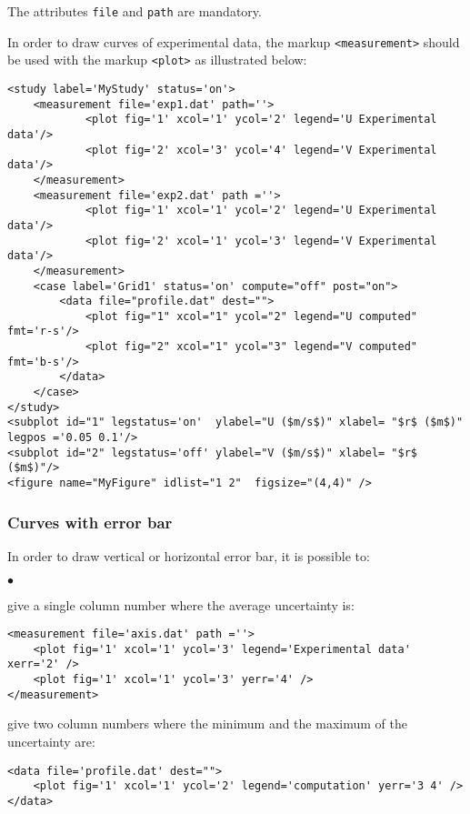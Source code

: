 \documentclass[a4paper,10pt,twoside]{article}
\begin{document}
The attributes \texttt{file} and \texttt{path} are mandatory.

In order to draw curves of experimental data, the markup \texttt{<measurement>}
should be used with the markup \texttt{<plot>} as illustrated below:

\small
\begin{verbatim}
<study label='MyStudy' status='on'>
    <measurement file='exp1.dat' path=''>
            <plot fig='1' xcol='1' ycol='2' legend='U Experimental data'/>
            <plot fig='2' xcol='3' ycol='4' legend='V Experimental data'/>
    </measurement>
    <measurement file='exp2.dat' path =''>
            <plot fig='1' xcol='1' ycol='2' legend='U Experimental data'/>
            <plot fig='2' xcol='1' ycol='3' legend='V Experimental data'/>
    </measurement>
    <case label='Grid1' status='on' compute="off" post="on">
        <data file="profile.dat" dest="">
            <plot fig="1" xcol="1" ycol="2" legend="U computed" fmt='r-s'/>
            <plot fig="2" xcol="1" ycol="3" legend="V computed" fmt='b-s'/>
        </data>
    </case>
</study>
<subplot id="1" legstatus='on'  ylabel="U ($m/s$)" xlabel= "$r$ ($m$)" legpos ='0.05 0.1'/>
<subplot id="2" legstatus='off' ylabel="V ($m/s$)" xlabel= "$r$ ($m$)"/>
<figure name="MyFigure" idlist="1 2"  figsize="(4,4)" />
\end{verbatim}
\normalsize

\subsubsection{Curves with error bar}\label{sec:err}

In order to draw vertical or horizontal error bar, it is possible to:
\begin{list}{$\bullet$}{}
\item give a single column number where the average uncertainty is:
\small
\begin{verbatim}
<measurement file='axis.dat' path =''>
    <plot fig='1' xcol='1' ycol='3' legend='Experimental data' xerr='2' />
    <plot fig='1' xcol='1' ycol='3' yerr='4' />
</measurement>
\end{verbatim}
\normalsize
\item give two column numbers where the minimum and the maximum of the
uncertainty are:
\small
\begin{verbatim}
<data file='profile.dat' dest="">
    <plot fig='1' xcol='1' ycol='2' legend='computation' yerr='3 4' />
</data>
\end{verbatim}
\normalsize
\end{list}
\end{document}
